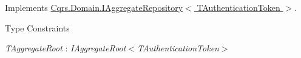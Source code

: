 Implements \hyperlink{interfaceCqrs_1_1Domain_1_1IAggregateRepository_a306baf8aa6faabe893f93e5db5d3517d}{Cqrs.\+Domain.\+I\+Aggregate\+Repository$<$ T\+Authentication\+Token $>$}.

\begin{Desc}
\item[Type Constraints]\begin{description}
\item[{\em T\+Aggregate\+Root} : {\em I\+Aggregate\+Root$<$T\+Authentication\+Token$>$}]\end{description}
\end{Desc}
